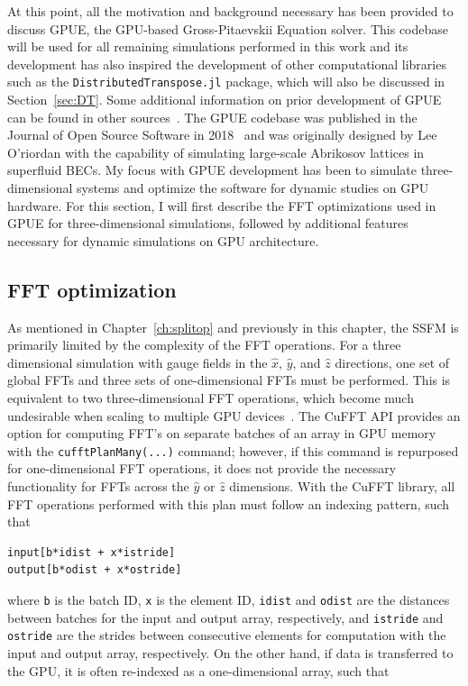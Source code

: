 At this point, all the motivation and background necessary has been provided to discuss GPUE, the GPU-based Gross-Pitaevskii Equation solver.
This codebase will be used for all remaining simulations performed in this work and its development has also inspired the development of other computational libraries such as the \texttt{DistributedTranspose.jl} package, which will also be discussed in Section~\ref{sec:DT}.
Some additional information on prior development of GPUE can be found in other sources~\cite{o2017}.
The GPUE codebase was published in the Journal of Open Source Software in 2018~\cite{schloss2018} and
was originally designed by Lee O'riordan with the capability of simulating large-scale Abrikosov lattices in superfluid BECs.
My focus with GPUE development has been to simulate three-dimensional systems and optimize the software for dynamic studies on GPU hardware.
For this section, I will first describe the FFT optimizations used in GPUE for three-dimensional simulations, followed by additional features necessary for dynamic simulations on GPU architecture.

\subsection{FFT optimization}

As mentioned in Chapter~\ref{ch:splitop} and previously in this chapter, the SSFM is primarily limited by the complexity of the FFT operations.
For a three dimensional simulation with gauge fields in the $\hat x$, $\hat y$, and $\hat z$ directions, one set of global FFTs and three sets of one-dimensional FFTs must be performed.
This is equivalent to two three-dimensional FFT operations, which become much undesirable when scaling to multiple GPU devices~\cite{czechowski2012}.
The CuFFT API provides an option for computing FFT's on separate batches of an array in GPU memory with the \texttt{cufftPlanMany(...)} command; however, if this command is repurposed for one-dimensional FFT operations, it does not provide the necessary functionality for FFTs across the $\hat y$ or $\hat z$ dimensions.
With the CuFFT library, all FFT operations performed with this plan must follow an indexing pattern, such that 

\begin{lstlisting}
input[b*idist + x*istride]
output[b*odist + x*ostride]
\end{lstlisting}

\noindent where \texttt{b} is the batch ID, \texttt{x} is the element ID, \texttt{idist} and \texttt{odist} are the distances between batches for the input and output array, respectively, and \texttt{istride} and \texttt{ostride} are the strides between consecutive elements for computation with the input and output array, respectively.
On the other hand, if data is transferred to the GPU, it is often re-indexed as a one-dimensional array, such that

